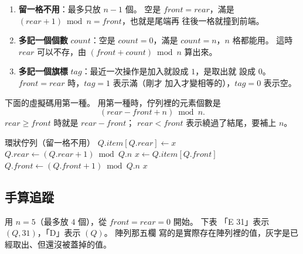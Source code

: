 \begin{enumerate}
\item \textbf{留一格不用}：最多只放 $n - 1$ 個。 空是 $\mathit{front} =
\mathit{rear}$，滿是 $(\mathit{rear} + 1) \bmod n = \mathit{front}$，也就是尾端再
往後一格就撞到前端。
\item \textbf{多記一個個數} $\mathit{count}$：空是 $\mathit{count} = 0$，滿是
$\mathit{count} = n$，$n$ 格都能用。 這時 $\mathit{rear}$ 可以不存，由
$(\mathit{front} + \mathit{count}) \bmod n$ 算出來。
\item \textbf{多記一個旗標} $\mathit{tag}$：最近一次操作是加入就設成 $1$，是取出就
設成 $0$。 $\mathit{front} = \mathit{rear}$ 時，$\mathit{tag} = 1$ 表示滿（剛才
加入才變相等的），$\mathit{tag} = 0$ 表示空。
\end{enumerate}

下面的虛擬碼用第一種。 用第一種時，佇列裡的元素個數是
\[
(\mathit{rear} - \mathit{front} + n) \bmod n.
\]
$\mathit{rear} \ge \mathit{front}$ 時就是 $\mathit{rear} - \mathit{front}$；
$\mathit{rear} < \mathit{front}$ 表示繞過了結尾，要補上 $n$。

\begin{pseudo}[label=alg:sq-circular]{環狀佇列（留一格不用）}
        \State {}
    \EndIf
    \State $Q.\mathit{item}[Q.\mathit{rear}] \gets x$
    \State $Q.\mathit{rear} \gets (Q.\mathit{rear} + 1) \bmod Q.n$
\EndProcedure
\Statex
{}
        \State {}
    \EndIf
    \State $x \gets Q.\mathit{item}[Q.\mathit{front}]$
    \State $Q.\mathit{front} \gets (Q.\mathit{front} + 1) \bmod Q.n$
    \State \Return $x$
\EndFunction
\end{pseudo}

\subsection{手算追蹤}

用 $n = 5$（最多放 $4$ 個），從 $\mathit{front} = \mathit{rear} = 0$ 開始。 下表
「E 31」表示 $(Q, 31)$，「D」表示 $(Q)$。 陣列那五欄
寫的是實際存在陣列裡的值，灰字是已經取出、但還沒被蓋掉的值。


